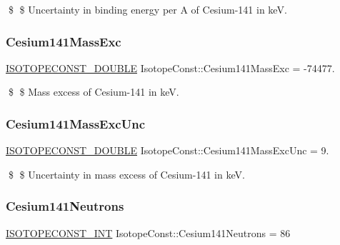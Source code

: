 \$ \$ Uncertainty in binding energy per A of Cesium-\/141 in keV. \mbox{\label{group___isotope_const-_cesium-_cs141_ga19293efc6dc8295963bffff64e0a9a12}} 
\subsubsection{\texorpdfstring{Cesium141\+Mass\+Exc}{Cesium141MassExc}}
{\footnotesize\ttfamily \mbox{\hyperlink{group___isotope_const-_macros_ga8f45a7272ce02c0b4c65c44636ed719a}{I\+S\+O\+T\+O\+P\+E\+C\+O\+N\+S\+T\+\_\+\+D\+O\+U\+B\+LE}} Isotope\+Const\+::\+Cesium141\+Mass\+Exc = -\/74477.}

\$ \$ Mass excess of Cesium-\/141 in keV. \mbox{\label{group___isotope_const-_cesium-_cs141_ga2c0958a382203ffbfe5a8e5d909d9f9e}} 
\subsubsection{\texorpdfstring{Cesium141\+Mass\+Exc\+Unc}{Cesium141MassExcUnc}}
{\footnotesize\ttfamily \mbox{\hyperlink{group___isotope_const-_macros_ga8f45a7272ce02c0b4c65c44636ed719a}{I\+S\+O\+T\+O\+P\+E\+C\+O\+N\+S\+T\+\_\+\+D\+O\+U\+B\+LE}} Isotope\+Const\+::\+Cesium141\+Mass\+Exc\+Unc = 9.}

\$ \$ Uncertainty in mass excess of Cesium-\/141 in keV. \mbox{\label{group___isotope_const-_cesium-_cs141_gac9f6926b9235b8a31032a99d99dce486}} 
\subsubsection{\texorpdfstring{Cesium141\+Neutrons}{Cesium141Neutrons}}
{\footnotesize\ttfamily \mbox{\hyperlink{group___isotope_const-_macros_ga5f18360b3e99483a35c32d789e62621c}{I\+S\+O\+T\+O\+P\+E\+C\+O\+N\+S\+T\+\_\+\+I\+NT}} Isotope\+Const\+::\+Cesium141\+Neutrons = 86}

